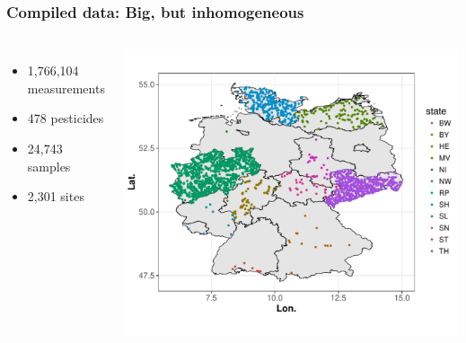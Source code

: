 \documentclass[
	10pt
	]{beamer}
\begin{document}
\begin{frame}
\frametitle{Compiled data: Big, but inhomogeneous}
	\begin{columns}
	    	\begin{itemize}
	    		\item 1,766,104 measurements 
	    		\item 478 pesticides 
	    		\item 24,743 samples 
	    		\item 2,301 sites
	    	\end{itemize}
	    	\includegraphics[width = 1.1\textwidth]{figs/map_phch.pdf}
	 \end{columns}
\end{frame}
\end{document}
